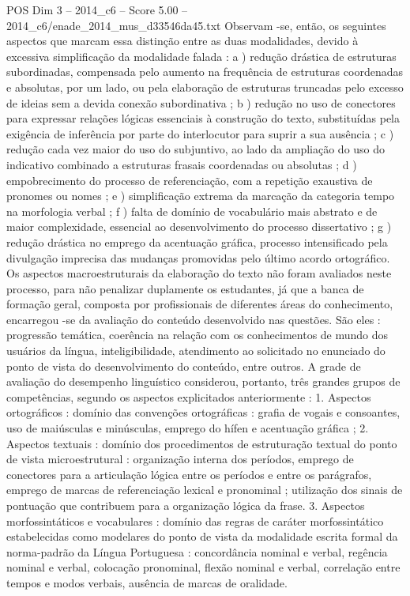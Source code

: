 \begin{textsample}{POS Dim 3 – 2014\_c6 – Score 5.00 – 2014\_c6/enade\_2014\_mus\_d33546da45.txt}
Observam -se, então, os seguintes aspectos que marcam essa distinção entre as duas modalidades, devido à excessiva simplificação da modalidade falada : a ) redução drástica de estruturas subordinadas, compensada pelo aumento na frequência de estruturas coordenadas e absolutas, por um lado, ou pela elaboração de estruturas truncadas pelo excesso de ideias sem a devida conexão subordinativa ; b ) redução no uso de conectores para expressar relações lógicas essenciais à construção do texto, substituídas pela exigência de inferência por parte do interlocutor para suprir a sua ausência ; c ) redução cada vez maior do uso do subjuntivo, ao lado da ampliação do uso do indicativo combinado a estruturas frasais coordenadas ou absolutas ; d ) empobrecimento do processo de referenciação, com a repetição exaustiva de pronomes ou nomes ; e ) simplificação extrema da marcação da categoria tempo na morfologia verbal ; f ) falta de domínio de vocabulário mais abstrato e de maior complexidade, essencial ao desenvolvimento do processo dissertativo ; g ) redução drástica no emprego da acentuação gráfica, processo intensificado pela divulgação imprecisa das mudanças promovidas pelo último acordo ortográfico.
Os aspectos macroestruturais da elaboração do texto não foram avaliados neste processo, para não penalizar duplamente os estudantes, já que a banca de formação geral, composta por profissionais de diferentes áreas do conhecimento, encarregou -se da avaliação do conteúdo desenvolvido nas questões.
São eles : progressão temática, coerência na relação com os conhecimentos de mundo dos usuários da língua, inteligibilidade, atendimento ao solicitado no enunciado do ponto de vista do desenvolvimento do conteúdo, entre outros.
A grade de avaliação do desempenho linguístico considerou, portanto, três grandes grupos de competências, segundo os aspectos explicitados anteriormente : 1.
Aspectos ortográficos : domínio das convenções ortográficas : grafia de vogais e consoantes, uso de maiúsculas e minúsculas, emprego do hífen e acentuação gráfica ; 2.
Aspectos textuais : domínio dos procedimentos de estruturação textual do ponto de vista microestrutural : organização interna dos períodos, emprego de conectores para a articulação lógica entre os períodos e entre os parágrafos, emprego de marcas de referenciação lexical e pronominal ; utilização dos sinais de pontuação que contribuem para a organização lógica da frase. 3.
Aspectos morfossintáticos e vocabulares : domínio das regras de caráter morfossintático estabelecidas como modelares do ponto de vista da modalidade escrita formal da norma-padrão da Língua Portuguesa : concordância nominal e verbal, regência nominal e verbal, colocação pronominal, flexão nominal e verbal, correlação entre tempos e modos verbais, ausência de marcas de oralidade.

\end{textsample}
